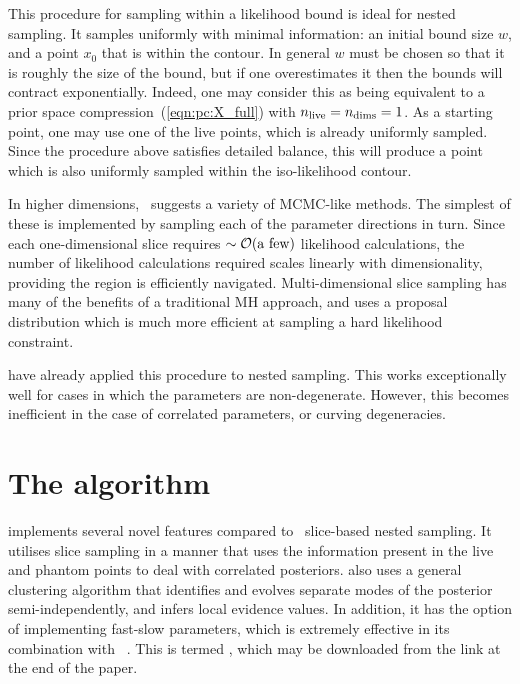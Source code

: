 This procedure for sampling within a likelihood bound is ideal for nested sampling. It samples uniformly with minimal information: an initial bound size $w$, and a point $x_0$ that is within the contour. In general $w$ must be chosen so that it is roughly the size of the bound, but if one overestimates it then the bounds will contract exponentially. Indeed, one may consider this as being equivalent to a prior space compression~(\ref{eqn:pc:X_full}) with $n_{\mathrm{live}}=n_{\mathrm{dims}}=1$. As a starting point, one may use one of the live points, which is already uniformly sampled. Since the procedure above satisfies detailed balance, this will produce a point which is also uniformly sampled within the iso-likelihood contour.

In higher dimensions,~\cite{NealSlice} suggests a variety of MCMC-like methods. The simplest of these is implemented by sampling each of the parameter directions in turn. Since each one-dimensional slice requires ${\sim\mathcal{O}{\left(\text{a few}\right)}}$ likelihood calculations, the number of likelihood calculations required scales linearly with dimensionality, providing the region is efficiently navigated. Multi-dimensional slice sampling has many of the benefits of a traditional MH approach, and uses a proposal distribution which is much more efficient at sampling a hard likelihood constraint.

\cite{SystemsBio} have already applied this procedure to nested sampling. This works exceptionally well for cases in which the parameters are non-degenerate. However, this becomes inefficient in the case of correlated parameters, or curving degeneracies.

\section{The \PolyChord{} algorithm}
\label{sec:pc:polychord_algorithm}

\PolyChord{} implements several novel features compared to~ slice-based nested sampling.  
It utilises slice sampling in a manner that uses the information present in the live and phantom points to deal with correlated posteriors. 
\PolyChord{} also uses a general clustering algorithm that identifies and evolves separate modes of the posterior semi-independently, and infers local evidence values.  
In addition, it has the option of implementing fast-slow parameters, which is extremely effective in its combination with \CosmoMC{}~\citep{cosmomc}. 
This is termed \CosmoChord, which may be downloaded from the link at the end of the paper.

